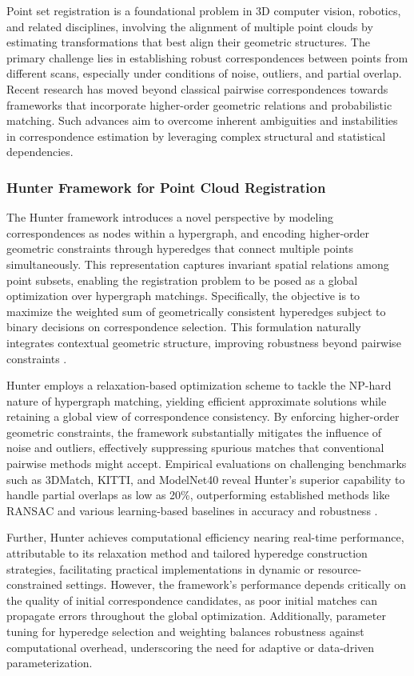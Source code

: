 \documentclass[sigconf]{acmart}
\begin{document}
Point set registration is a foundational problem in 3D computer vision, robotics, and related disciplines, involving the alignment of multiple point clouds by estimating transformations that best align their geometric structures. The primary challenge lies in establishing robust correspondences between points from different scans, especially under conditions of noise, outliers, and partial overlap. Recent research has moved beyond classical pairwise correspondences towards frameworks that incorporate higher-order geometric relations and probabilistic matching. Such advances aim to overcome inherent ambiguities and instabilities in correspondence estimation by leveraging complex structural and statistical dependencies.

\subsubsection{Hunter Framework for Point Cloud Registration}

The Hunter framework introduces a novel perspective by modeling correspondences as nodes within a hypergraph, and encoding higher-order geometric constraints through hyperedges that connect multiple points simultaneously. This representation captures invariant spatial relations among point subsets, enabling the registration problem to be posed as a global optimization over hypergraph matchings. Specifically, the objective is to maximize the weighted sum of geometrically consistent hyperedges subject to binary decisions on correspondence selection. This formulation naturally integrates contextual geometric structure, improving robustness beyond pairwise constraints \cite{ref6}.

Hunter employs a relaxation-based optimization scheme to tackle the NP-hard nature of hypergraph matching, yielding efficient approximate solutions while retaining a global view of correspondence consistency. By enforcing higher-order geometric constraints, the framework substantially mitigates the influence of noise and outliers, effectively suppressing spurious matches that conventional pairwise methods might accept. Empirical evaluations on challenging benchmarks such as 3DMatch, KITTI, and ModelNet40 reveal Hunter’s superior capability to handle partial overlaps as low as 20\%, outperforming established methods like RANSAC and various learning-based baselines in accuracy and robustness \cite{ref6}.

Further, Hunter achieves computational efficiency nearing real-time performance, attributable to its relaxation method and tailored hyperedge construction strategies, facilitating practical implementations in dynamic or resource-constrained settings. However, the framework’s performance depends critically on the quality of initial correspondence candidates, as poor initial matches can propagate errors throughout the global optimization. Additionally, parameter tuning for hyperedge selection and weighting balances robustness against computational overhead, underscoring the need for adaptive or data-driven parameterization.
\end{document}
